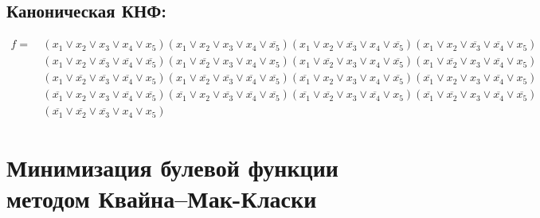 \documentclass{article}
\begin{document}
\subsection*{Каноническая КНФ:}
\begin{align*}
f =\: &\left(x_{1} \lor x_{2} \lor x_{3} \lor x_{4} \lor x_{5}\right)\left(x_{1} \lor x_{2} \lor x_{3} \lor x_{4} \lor \overline{x_{5}}\right)\left(x_{1} \lor x_{2} \lor \overline{x_{3}} \lor x_{4} \lor \overline{x_{5}}\right)\left(x_{1} \lor x_{2} \lor \overline{x_{3}} \lor \overline{x_{4}} \lor x_{5}\right)\\&\left(x_{1} \lor x_{2} \lor \overline{x_{3}} \lor \overline{x_{4}} \lor \overline{x_{5}}\right)\left(x_{1} \lor \overline{x_{2}} \lor x_{3} \lor x_{4} \lor x_{5}\right)\left(x_{1} \lor \overline{x_{2}} \lor x_{3} \lor x_{4} \lor \overline{x_{5}}\right)\left(x_{1} \lor \overline{x_{2}} \lor x_{3} \lor \overline{x_{4}} \lor x_{5}\right)\\&\left(x_{1} \lor \overline{x_{2}} \lor \overline{x_{3}} \lor \overline{x_{4}} \lor x_{5}\right)\left(x_{1} \lor \overline{x_{2}} \lor \overline{x_{3}} \lor \overline{x_{4}} \lor \overline{x_{5}}\right)\left(\overline{x_{1}} \lor x_{2} \lor x_{3} \lor x_{4} \lor \overline{x_{5}}\right)\left(\overline{x_{1}} \lor x_{2} \lor x_{3} \lor \overline{x_{4}} \lor x_{5}\right)\\&\left(\overline{x_{1}} \lor x_{2} \lor x_{3} \lor \overline{x_{4}} \lor \overline{x_{5}}\right)\left(\overline{x_{1}} \lor x_{2} \lor \overline{x_{3}} \lor \overline{x_{4}} \lor \overline{x_{5}}\right)\left(\overline{x_{1}} \lor \overline{x_{2}} \lor x_{3} \lor \overline{x_{4}} \lor x_{5}\right)\left(\overline{x_{1}} \lor \overline{x_{2}} \lor x_{3} \lor \overline{x_{4}} \lor \overline{x_{5}}\right)\\&\left(\overline{x_{1}} \lor \overline{x_{2}} \lor \overline{x_{3}} \lor x_{4} \lor x_{5}\right)\end{align*}
\section*{Минимизация булевой функции методом Квайна--Мак-Класки}
\end{document}
